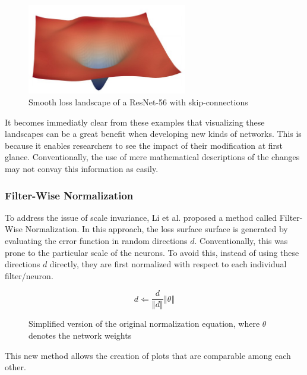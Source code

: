 \documentclass{acmsiggraph}               %
\begin{document}
\begin{figure}
  \centering
  \includegraphics[width=2.75in]{smooth_loss}
  \caption{Smooth loss landscape of a ResNet-56 with skip-connections \protect\cite{Li2017,He2015}}
  \label{fig:smooth_loss}
\end{figure}

It becomes immediatly clear from these examples that visualizing these landscapes can be a great benefit when developing new kinds of networks. This is because it enables researchers to see the impact of their modification at first glance. Conventionally, the use of mere mathematical descriptions of the changes may not convay this information as easily.

\subsubsection{Filter-Wise Normalization}

To address the issue of scale invariance, Li et al. proposed a method called Filter-Wise Normalization. In this approach, the loss surface surface is generated by evaluating the error function in random directions $d$. Conventionally, this was prone to the particular scale of the neurons. To avoid this, instead of using these directions $d$ directly, they are first normalized with respect to each individual filter/neuron.

\begin{figure}
\begin{equation}
  d \Leftarrow \frac{d}{\left\Vert d \right\Vert} \left\Vert\theta\right\Vert
\end{equation}
\caption{Simplified version of the original normalization equation, where $\theta$ denotes the network weights \protect\cite{Li2017}}
\end{figure}

This new method allows the creation of plots that are comparable among each other.
\end{document}
